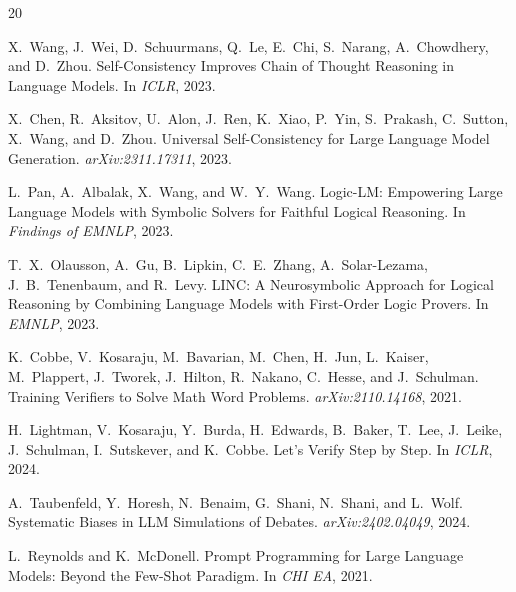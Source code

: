 \documentclass[11pt]{article}
\begin{document}


\begin{thebibliography}{20}

X.~Wang, J.~Wei, D.~Schuurmans, Q.~Le, E.~Chi, S.~Narang, A.~Chowdhery, and D.~Zhou.
\newblock Self-Consistency Improves Chain of Thought Reasoning in Language Models.
\newblock In \emph{ICLR}, 2023.

X.~Chen, R.~Aksitov, U.~Alon, J.~Ren, K.~Xiao, P.~Yin, S.~Prakash, C.~Sutton, X.~Wang, and D.~Zhou.
\newblock Universal Self-Consistency for Large Language Model Generation.
\newblock \emph{arXiv:2311.17311}, 2023.

L.~Pan, A.~Albalak, X.~Wang, and W.~Y.~Wang.
\newblock Logic-LM: Empowering Large Language Models with Symbolic Solvers for Faithful Logical Reasoning.
\newblock In \emph{Findings of EMNLP}, 2023.

T.~X.~Olausson, A.~Gu, B.~Lipkin, C.~E.~Zhang, A.~Solar-Lezama, J.~B.~Tenenbaum, and R.~Levy.
\newblock LINC: A Neurosymbolic Approach for Logical Reasoning by Combining Language Models with First-Order Logic Provers.
\newblock In \emph{EMNLP}, 2023.

K.~Cobbe, V.~Kosaraju, M.~Bavarian, M.~Chen, H.~Jun, L.~Kaiser, M.~Plappert, J.~Tworek, J.~Hilton, R.~Nakano, C.~Hesse, and J.~Schulman.
\newblock Training Verifiers to Solve Math Word Problems.
\newblock \emph{arXiv:2110.14168}, 2021.

H.~Lightman, V.~Kosaraju, Y.~Burda, H.~Edwards, B.~Baker, T.~Lee, J.~Leike, J.~Schulman, I.~Sutskever, and K.~Cobbe.
\newblock Let's Verify Step by Step.
\newblock In \emph{ICLR}, 2024.

A.~Taubenfeld, Y.~Horesh, N.~Benaim, G.~Shani, N.~Shani, and L.~Wolf.
\newblock Systematic Biases in LLM Simulations of Debates.
\newblock \emph{arXiv:2402.04049}, 2024.

L.~Reynolds and K.~McDonell.
\newblock Prompt Programming for Large Language Models: Beyond the Few-Shot Paradigm.
\newblock In \emph{CHI EA}, 2021.

\end{thebibliography}
\end{document}
